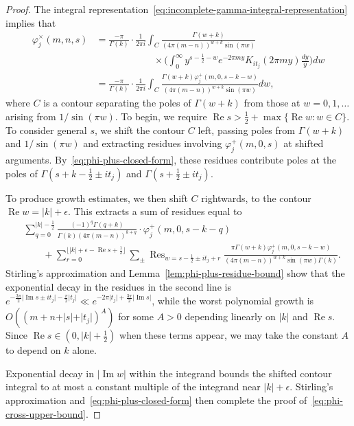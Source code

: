 \documentclass[10pt,a4paper]{amsart}
\DeclareMathOperator*{\Res}{Res}
\renewcommand{\Im}{\operatorname{Im}}
\renewcommand{\Re}{\operatorname{Re}}
\begin{document}
\begin{proof}
The integral representation~\eqref{eq:incomplete-gamma-integral-representation} implies that
\begin{align}
	\varphi_j^\times(m,n,s)
		&=
			\frac{-\pi}{\Gamma(k)} 
			\cdot  \frac{1}{2\pi i} \int_C \frac{\Gamma(w+k)}{(4\pi(m-n))^{w+k} \sin(\pi w)} \\
		& \qquad\qquad \qquad
	\times\Big( \int_0^\infty \! y^{s-\frac{1}{2}-w} e^{-2\pi m y} K_{it_j}(2\pi m y) \frac{dy}{y} \Big) dw \\
		\label{eq:phi-cross-integral-representation}
		&= 
			\frac{-\pi}{\Gamma(k)} \cdot  \frac{1}{2\pi i} 
			\int_C \frac{\Gamma(w+k)\varphi_j^+(m,0, s-k-w)}{(4\pi(m-n))^{w+k} \sin(\pi w)} dw,
\end{align}
where $C$ is a contour separating the poles of $\Gamma(w+k)$ from those at $w=0,1,\ldots$ arising from $1/\sin(\pi w)$. To begin, we require $\Re s > \frac{1}{2} + \max \{\Re w: w \in C\}$. To consider general $s$, we shift the contour $C$ left, passing poles from $\Gamma(w+k)$ and $1/\sin(\pi w)$ and extracting residues involving $\varphi_j^+(m,0,s)$ at shifted arguments. By~\eqref{eq:phi-plus-closed-form}, these residues contribute poles at the poles of $\Gamma(s+k-\frac{1}{2} \pm it_j)$ and $\Gamma(s + \frac{1}{2} \pm it_j)$.

To produce growth estimates, we then shift $C$ rightwards, to the contour $\Re w = \vert k \vert + \epsilon$. This extracts a sum of residues equal to
\begin{align*}
	& \sum_{q = 0}^{\vert k \vert - \frac{1}{2}} 
			\frac{(-1)^q\Gamma(q+k)}{\Gamma(k) (4\pi(m-n))^{k+q}} \cdot \varphi_j^+(m,0,s-k-q) \\[-.38em]
	& \qquad + \!\!\!\!
		\sum_{r=0}^{\lfloor \vert k \vert +\epsilon - \Re s + \frac{1}{2} \rfloor} \!\!\!\!
		\sum_{\pm}
			\Res_{w = s-\frac{1}{2} \pm it_j +r}
				\frac{\pi \Gamma(w+k)\varphi_j^+(m,0, s-k-w)}{(4\pi(m-n))^{w+k} \sin(\pi w) \Gamma(k)}.
\end{align*}
Stirling's approximation and Lemma~\ref{lem:phi-plus-residue-bound} show that the exponential decay in the residues in the second line is $e^{-\frac{3\pi}{2} \vert \Im s \pm it_j \vert - \frac{\pi}{2} \vert t_j \vert} \ll e^{-2\pi \vert t_j \vert + \frac{3\pi}{2} \vert \Im s \vert}$, while the worst polynomial growth is $O((m+n+ \vert s \vert + \vert t_j \vert)^A)$ for some $A> 0$ depending linearly on $\vert k \vert$ and $\Re s $. Since $\Re s \in (0, \vert k \vert + \frac{1}{2})$ when these terms appear, we may take the constant $A$ to depend on $k$ alone.


Exponential decay in $\vert \Im w \vert$ within the integrand bounds the shifted contour integral to at most a constant multiple of the integrand near $\vert k \vert + \epsilon$. Stirling's approximation and~\eqref{eq:phi-plus-closed-form} then complete the proof of~\eqref{eq:phi-cross-upper-bound}.
\end{proof}
\end{document}
